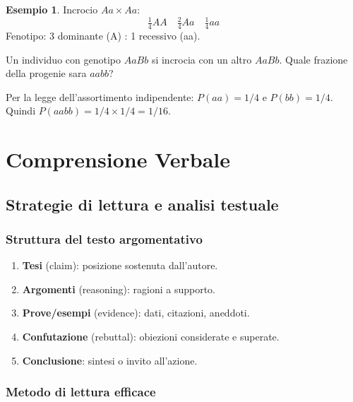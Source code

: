 \documentclass[12pt, a4paper, twoside, openright]{book}
\theoremstyle{definition}
\newtheorem{esempio}{Esempio}[section]
\begin{document}
\begin{esempio}
Incrocio $Aa \times Aa$:
\[
\tfrac{1}{4}AA \quad \tfrac{2}{4}Aa \quad \tfrac{1}{4}aa
\]
Fenotipo: 3 dominante (A\textunderscore) : 1 recessivo (aa).
\end{esempio}

\begin{esercizio}
Un individuo con genotipo $AaBb$ si incrocia con un altro $AaBb$.
Quale frazione della progenie sara $aabb$?
\end{esercizio}
\begin{soluzione}
Per la legge dell'assortimento indipendente:
$P(aa) = 1/4$ e $P(bb) = 1/4$.
Quindi $P(aabb) = 1/4 \times 1/4 = 1/16$.
\end{soluzione}

\part{Comprensione Verbale}

\chapter{Strategie di lettura e analisi testuale}

\section{Struttura del testo argomentativo}

\begin{defbox}
\begin{enumerate}
  \item \textbf{Tesi} (claim): posizione sostenuta dall'autore.
  \item \textbf{Argomenti} (reasoning): ragioni a supporto.
  \item \textbf{Prove/esempi} (evidence): dati, citazioni, aneddoti.
  \item \textbf{Confutazione} (rebuttal): obiezioni considerate e superate.
  \item \textbf{Conclusione}: sintesi o invito all'azione.
\end{enumerate}
\end{defbox}

\section{Metodo di lettura efficace}
\end{document}
